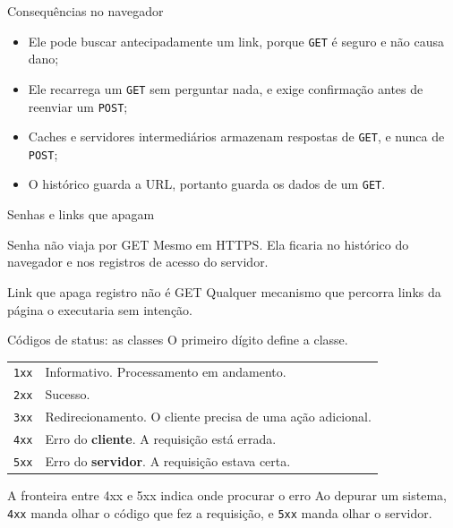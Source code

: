 \documentclass{beamer}
\begin{document}
\begin{frame}{Consequências no navegador}
  \begin{itemize}
    \item Ele pode buscar antecipadamente um link, porque \texttt{GET} é seguro
          e não causa dano;
    \item Ele recarrega um \texttt{GET} sem perguntar nada, e exige confirmação
          antes de reenviar um \texttt{POST};
    \item Caches e servidores intermediários armazenam respostas de
          \texttt{GET}, e nunca de \texttt{POST};
    \item O histórico guarda a URL, portanto guarda os dados de um \texttt{GET}.
  \end{itemize}
\end{frame}

\begin{frame}{Senhas e links que apagam}
  \begin{alertblock}{Senha não viaja por GET}
    Mesmo em HTTPS. Ela ficaria no histórico do navegador e nos registros de
    acesso do servidor.
  \end{alertblock}

  \begin{alertblock}{Link que apaga registro não é GET}
    Qualquer mecanismo que percorra links da página o executaria sem intenção.
  \end{alertblock}
\end{frame}

\begin{frame}{Códigos de status: as classes}
  O primeiro dígito define a classe.

  \begin{center}
    \small
    \begin{tabular}{@{}lp{7cm}@{}}
      \toprule
      \texttt{1xx} & Informativo. Processamento em andamento. \\
      \texttt{2xx} & Sucesso. \\
      \texttt{3xx} & Redirecionamento. O cliente precisa de uma ação adicional. \\
      \texttt{4xx} & Erro do \textbf{cliente}. A requisição está errada. \\
      \texttt{5xx} & Erro do \textbf{servidor}. A requisição estava certa. \\
      \bottomrule
    \end{tabular}
  \end{center}

  \vspace{0.4cm}
  \begin{block}{A fronteira entre 4xx e 5xx indica onde procurar o erro}
    Ao depurar um sistema, \texttt{4xx} manda olhar o código que fez a
    requisição, e \texttt{5xx} manda olhar o servidor.
  \end{block}
\end{frame}
\end{document}
